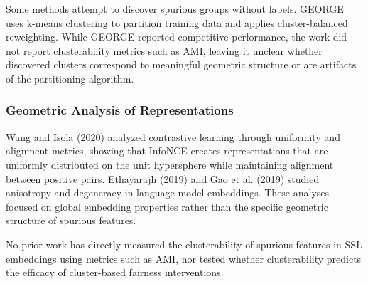 Some methods attempt to discover spurious groups without labels. GEORGE \citep{sohoni2021george} uses k-means clustering to partition training data and applies cluster-balanced reweighting. While GEORGE reported competitive performance, the work did not report clusterability metrics such as AMI, leaving it unclear whether discovered clusters correspond to meaningful geometric structure or are artifacts of the partitioning algorithm.

\subsubsection{Geometric Analysis of Representations}

Wang and Isola (2020) analyzed contrastive learning through uniformity and alignment metrics, showing that InfoNCE creates representations that are uniformly distributed on the unit hypersphere while maintaining alignment between positive pairs. Ethayarajh (2019) and Gao et al. (2019) studied anisotropy and degeneracy in language model embeddings. These analyses focused on global embedding properties rather than the specific geometric structure of spurious features.

No prior work has directly measured the clusterability of spurious features in SSL embeddings using metrics such as AMI, nor tested whether clusterability predicts the efficacy of cluster-based fairness interventions.
